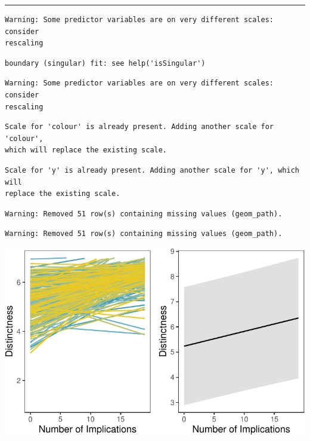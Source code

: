 \documentclass[
  .7em,
  letterpaper,
  DIV=11,
  numbers=noendperiod]{scrartcl}
\begin{document}
\begin{center}\rule{0.5\linewidth}{0.5pt}\end{center}

\begin{verbatim}
Warning: Some predictor variables are on very different scales: consider
rescaling
\end{verbatim}

\begin{verbatim}
boundary (singular) fit: see help('isSingular')
\end{verbatim}

\begin{verbatim}
Warning: Some predictor variables are on very different scales: consider
rescaling
\end{verbatim}

\begin{verbatim}
Scale for 'colour' is already present. Adding another scale for 'colour',
which will replace the existing scale.
\end{verbatim}

\begin{verbatim}
Scale for 'y' is already present. Adding another scale for 'y', which will
replace the existing scale.
\end{verbatim}

\begin{verbatim}
Warning: Removed 51 row(s) containing missing values (geom_path).
\end{verbatim}

\begin{verbatim}
Warning: Removed 51 row(s) containing missing values (geom_path).
\end{verbatim}

\includegraphics{EpMemNet_LabPres_htmldoc_files/figure-pdf/unnamed-chunk-33-1.pdf}
\end{document}
